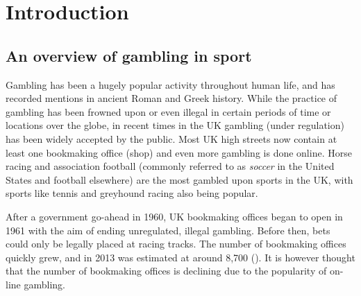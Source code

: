 
\singlespacing

\chapter{Introduction}
\label{ch:Introduction}

\onehalfspacing

\section{An overview of gambling in sport}
\label{sec:An_overview_of_gambling_in_sport}

Gambling has been a hugely popular activity throughout human life, and has recorded mentions in ancient Roman and Greek
history. While the practice of gambling has been frowned upon or even illegal in certain periods of time or locations
over the globe, in recent times in the UK gambling (under regulation) has been widely accepted by the public. Most UK
high streets now contain at least one bookmaking office (shop) and even more gambling is done online. Horse racing and
association football (commonly referred to as \textit{soccer} in the United States and football elsewhere) are the most
gambled upon sports in the UK, with sports like tennis and greyhound racing also being popular.

After a government go-ahead in 1960, UK bookmaking offices began to open in 1961 with the aim of ending unregulated,
illegal gambling. Before then, bets could only be legally placed at racing tracks. The number of bookmaking offices
quickly grew, and in 2013 was estimated at around 8,700 (\cite{bettingShops}). It is however thought that the number of
bookmaking offices is declining due to the popularity of on-line gambling.

